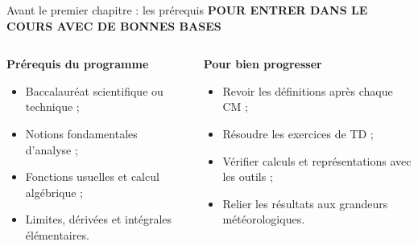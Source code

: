 \documentclass[aspectratio=169,10pt]{beamer}
\newcommand{\meta}[1]{{\small\bfseries\color{turquoise} #1}\par\vspace{0.07cm}}
\newcommand{\smalllist}{\setlength{\itemsep}{0.04cm}\setlength{\parskip}{0pt}}
\begin{document}
\begin{frame}{Avant le premier chapitre : les prérequis}
\meta{POUR ENTRER DANS LE COURS AVEC DE BONNES BASES}
\begin{columns}[T,onlytextwidth]
\begin{tcolorbox}[colback=pale,colframe=pale,height=3.80cm]
{\bfseries\color{bleu}Prérequis du programme}\par\vspace{0.25cm}
\small
\begin{itemize}\smalllist
\item Baccalauréat scientifique ou technique ;
\item Notions fondamentales d'analyse ;
\item Fonctions usuelles et calcul algébrique ;
\item Limites, dérivées et intégrales élémentaires.
\end{itemize}
\end{tcolorbox}
\begin{tcolorbox}[colback=palevert,colframe=palevert,height=3.80cm]
{\bfseries\color{turquoise}Pour bien progresser}\par\vspace{0.25cm}
\small
\begin{itemize}\smalllist
\item Revoir les définitions après chaque CM ;
\item Résoudre les exercices de TD ;
\item Vérifier calculs et représentations avec les outils ;
\item Relier les résultats aux grandeurs météorologiques.
\end{itemize}
\end{tcolorbox}
\end{columns}

\end{frame}
\end{document}
